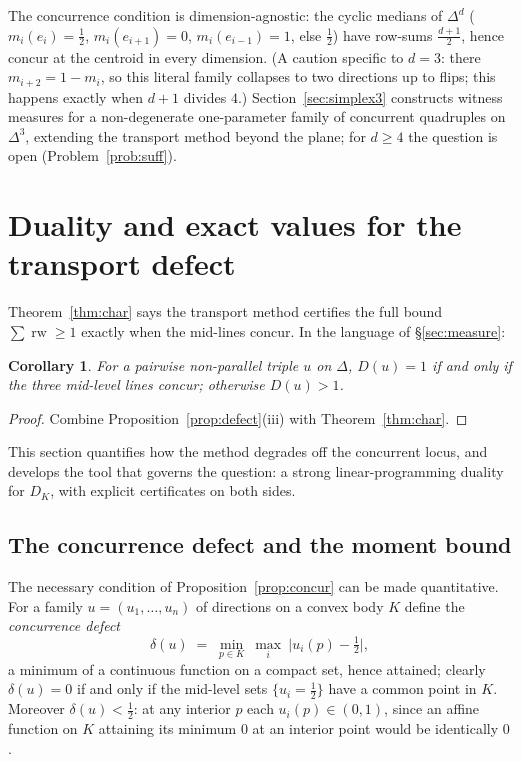 \documentclass[11pt,reqno]{amsart}
\theoremstyle{plain}
\newtheorem{corollary}[theorem]{Corollary}
\theoremstyle{definition}
\theoremstyle{remark}
\newcommand{\rw}{\operatorname{rw}}
\begin{document}
\smallskip
The concurrence condition is dimension-agnostic: the cyclic medians of $\Delta^d$
($m_i(e_i)=\tfrac12$, $m_i(e_{i+1})=0$, $m_i(e_{i-1})=1$, else $\tfrac12$) have
row-sums $\tfrac{d+1}2$, hence concur at the centroid in every dimension. (A
caution specific to $d=3$: there $m_{i+2}=1-m_i$, so this literal family collapses
to two directions up to flips; this happens exactly when $d+1$ divides $4$.)
Section~\ref{sec:simplex3} constructs witness measures for a non-degenerate
one-parameter family of concurrent quadruples on $\Delta^3$, extending the
transport method beyond the plane; for $d\ge4$ the question is open
(Problem~\ref{prob:suff}).

\section{Duality and exact values for the transport defect}\label{sec:defect}
Theorem~\ref{thm:char} says the transport method certifies the full bound
$\sum\rw\ge1$ exactly when the mid-lines concur. In the language of
\S\ref{sec:measure}:

\begin{corollary}\label{cor:done}
For a pairwise non-parallel triple $u$ on $\Delta$, $D(u)=1$ if and only if the
three mid-level lines concur; otherwise $D(u)>1$.
\end{corollary}
\begin{proof}
Combine Proposition~\ref{prop:defect}(iii) with Theorem~\ref{thm:char}.
\end{proof}

This section quantifies how the method degrades off the concurrent locus, and
develops the tool that governs the question: a strong linear-programming
duality for $D_K$, with explicit certificates on both sides.

\subsection*{The concurrence defect and the moment bound}
The necessary condition of Proposition~\ref{prop:concur} can be made
quantitative. For a family $u=(u_1,\dots,u_n)$ of directions on a convex body
$K$ define the \emph{concurrence defect}
\begin{equation}\label{eq:cdefect}
\delta(u)\;=\;\min_{p\in K}\ \max_{i}\ \bigl|u_i(p)-\tfrac12\bigr|,
\end{equation}
a minimum of a continuous function on a compact set, hence attained; clearly
$\delta(u)=0$ if and only if the mid-level sets $\{u_i=\tfrac12\}$ have a
common point in $K$. Moreover $\delta(u)<\tfrac12$:
at any interior $p$ each $u_i(p)\in(0,1)$, since an affine function on $K$
attaining its minimum $0$ at an interior point would be identically $0$.
\end{document}

